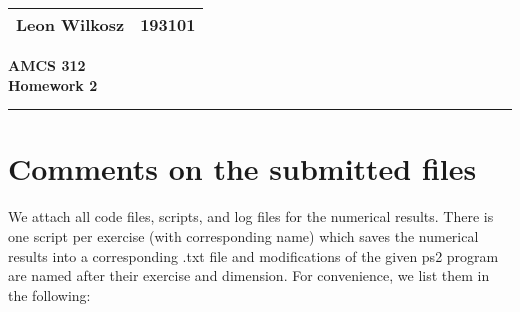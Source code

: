 \documentclass[
a4paper,
]{article}
\newcommand{\1}{\mathds{1}}
\begin{document}
	
	
	\begin{flushright}
		\begin{tabular}{|l|c|}
			\hline
			Leon Wilkosz & 193101 \\ \hline
		\end{tabular}
	\end{flushright}
	\begin{center}
		\Large \textbf{AMCS 312}\\ \medskip
		\large\textbf{Homework 2}\\
	\end{center}
	\medskip
	\hrule
	\vspace{10pt}

\section*{Comments on the submitted files}
We attach all code files, scripts, and log files for the numerical results. There is one script per exercise (with corresponding name) which saves the numerical results into a corresponding .txt file and modifications of the given ps2 program are named after their exercise and dimension. For convenience, we list them in the following:
\end{document}
